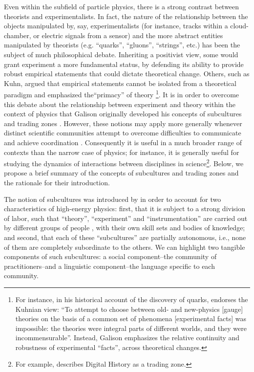\documentclass[smallextended]{svjour3}
\begin{document}
Even within the subfield of particle physics, there is a strong contrast between theorists and experimentalists. In fact, the nature of the relationship between the objects manipulated by, say, experimentalists (for instance, tracks within a cloud-chamber, or electric signals from a sensor) and the more abstract entities manipulated by theorists (e.g. ``quarks'', ``gluons'', ``strings'', etc.) has been the subject of much philosophical debate. Inheriting a positivist view, some would grant experiment a more fundamental status, by defending its ability to provide robust empirical statements that could dictate theoretical  change. Others, such as Kuhn, argued that empirical statements cannot be isolated from a theoretical paradigm and emphasized the``primacy'' of theory \citep{Galison1988}\footnote{For instance, in his historical account of the discovery of quarks, \citet[p.~411]{pickering1984constructing} endorses the Kuhnian view: ``To attempt to choose between old- and new-physics [gauge] theories on the basis of a common set of phenomena [experimental facts] was impossible: the theories were integral parts of different worlds, and they were incommensurable''. Instead, Galison emphasizes the relative continuity and robustness of experimental ``facts'', across theoretical changes.}. It is in order to overcome this debate about the relationship between experiment and theory within the context of physics that Galison originally developed his concepts of subcultures and trading zones  \citep{galison1987how,galison1997image}. However, these notions may apply more generally whenever distinct scientific communities attempt to overcome difficulties to communicate and achieve coordination \citep[p.~8]{Collins2010}. Consequently it is useful in a much broader range of contexts than the narrow case of physics; for instance, it is generally useful for studying the dynamics of interactions between disciplines in science\footnote{For example, \citet{Kemman2021} describes Digital History as a trading zone.}. Below, we propose a brief summary of the concepts of subcultures and trading zones and the rationale for their introduction.

The notion of subcultures was introduced by \citet{galison1987how,Galison1988} in order to account for two characteristics of high-energy physics: first, that it is subject to a strong division of labor, such that ``theory'', ``experiment'' and ``instrumentation'' are carried out by different groups of people \citep[p.~138]{galison1987how}, with their own skill sets and bodies of knowledge; and second, that each of these ``subcultures'' are partially autonomous, i.e., none of them are completely subordinate to the others. We can highlight two tangible components of such subcultures: a social component--the community of practitioners--and a linguistic component--the language specific to each community.
\end{document}
